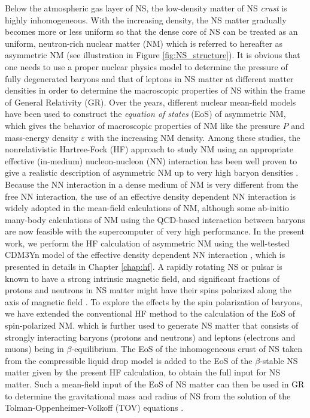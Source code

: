 Below the atmospheric gas layer of \gls{NS}, the low-density matter of NS \emph{crust}
is highly inhomogeneous. With the increasing density, the NS matter gradually becomes more 
or less uniform so that the dense core of NS can be treated as an uniform, neutron-rich
nuclear matter (NM) which is referred to hereafter as asymmetric NM (see illustration in  
Figure \ref{fig:NS_structure}). It is obvious that one needs to use a proper nuclear physics
model to determine the pressure of fully degenerated baryons and that of leptons in NS matter 
at different matter densities in order to determine the macroscopic properties of NS 
within the frame of General Relativity (GR). Over the years, different nuclear mean-field 
models have been used to construct the \emph{equation of states} (\gls{EoS}) of asymmetric NM, 
which gives the behavior of macroscopic properties of NM like the pressure $P$ and mass-energy 
density $\varepsilon$ with the increasing NM density. Among these studies, the nonrelativistic
Hartree-Fock (\gls{HF}) approach to study NM using an appropriate effective (in-medium) 
nucleon-nucleon (NN) interaction has been well proven to give a realistic description 
of asymmetric NM up to very high baryon densities \citep{khoa1996study}. Because the NN 
interaction in a dense medium of NM is very different from the free NN interaction, the use 
of an effective density dependent NN interaction is widely adopted in the mean-field 
calculations of NM, although
some ab-initio many-body calculations of NM using the QCD-based interaction between baryons
are now feasible with the supercomputer of very high performance. In the present work, we
perform the HF calculation of asymmetric NM using the well-tested CDM3Yn model of the effective
density dependent NN interaction \citep{tan2021equation}, which is presented in details
in Chapter \ref{chap:hf}. A rapidly rotating NS or pulsar is known to have a strong intrinsic
magnetic field, and significant fractions of protons and neutrons in NS matter might  
have their spins polarized along the axis of magnetic field \cite{broderick2000equation}. To explore the effects
by the spin polarization of baryons, we have extended the conventional HF method to the calculation
of the EoS of spin-polarized NM. which is further used to generate NS matter that consists 
of strongly interacting baryons (protons and neutrons) and leptons (electrons and muons) 
being in $\beta$-equilibrium. The EoS of the inhomogeneous crust of NS taken from the 
compressible liquid drop model \citep{douchin2000nuclear,douchin2001unified} is added to the \gls{EoS} of the $\beta$-stable 
NS matter given by the present \gls{HF} calculation, to obtain the full input
for NS matter. Such a mean-field input of the EoS of NS matter can then be used in GR 
to determine the gravitational mass and radius of NS \citep{tan2020spin,tan2021equation} 
from the solution of the Tolman-Oppenheimer-Volkoff (\gls{TOV}) equations \citep{oppenheimer1939massive}. 

